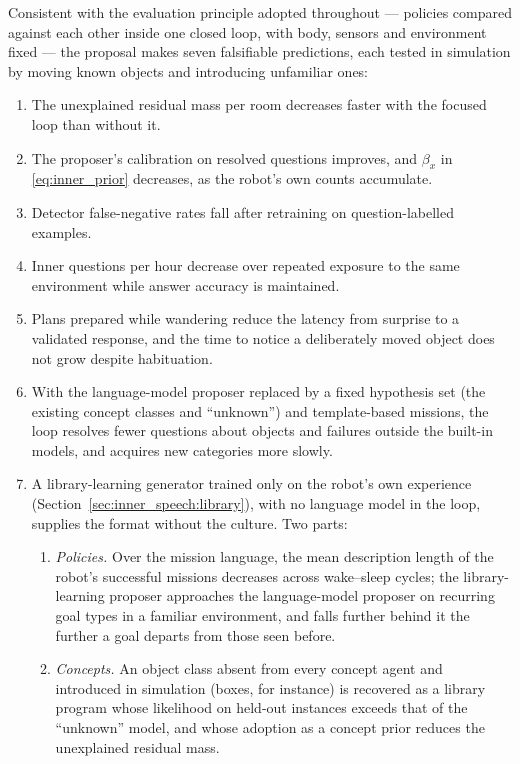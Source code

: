 Consistent with the evaluation principle adopted throughout --- policies compared against each other inside one
closed loop, with body, sensors and environment fixed --- the proposal makes seven falsifiable predictions, each
tested in simulation by moving known objects and introducing unfamiliar ones:
\begin{enumerate}[label=\textbf{P\arabic*}]
    \item The unexplained residual mass per room decreases faster with the focused loop than without it.
    \item The proposer's calibration on resolved questions improves, and $\beta_x$ in \eqref{eq:inner_prior}
    decreases, as the robot's own counts accumulate.
    \item Detector false-negative rates fall after retraining on question-labelled examples.
    \item Inner questions per hour decrease over repeated exposure to the same environment while answer accuracy
    is maintained.
    \item Plans prepared while wandering reduce the latency from surprise to a validated response, and the time to
    notice a deliberately moved object does not grow despite habituation.
    \item With the language-model proposer replaced by a fixed hypothesis set (the existing concept classes and
    ``unknown'') and template-based missions, the loop resolves fewer questions about objects and failures outside
    the built-in models, and acquires new categories more slowly.
    \item A library-learning generator trained only on the robot's own experience
    (Section~\ref{sec:inner_speech:library}), with no language model in the loop, supplies the format without the
    culture. Two parts:
    \begin{enumerate}[label=(\alph*)]
        \item \emph{Policies.} Over the mission language, the mean description length of the robot's successful
        missions decreases across wake--sleep cycles; the library-learning proposer approaches the language-model
        proposer on recurring goal types in a familiar environment, and falls further behind it the further a goal
        departs from those seen before.
        \item \emph{Concepts.} An object class absent from every concept agent and introduced in simulation (boxes,
        for instance) is recovered as a library program whose likelihood on held-out instances exceeds that of the
        ``unknown'' model, and whose adoption as a concept prior reduces the unexplained residual mass.
    \end{enumerate}
\end{enumerate}
